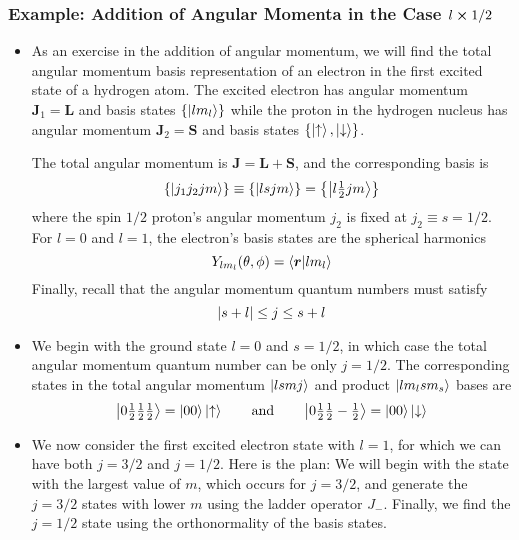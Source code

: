 \documentclass[11pt, a4paper]{article}
\renewcommand{\vec}[1]{\bm{#1}}  %
\newcommand{\ua}{\uparrow}  %
\newcommand{\da}{\downarrow}  %
\renewcommand{\r}{\vec{r}}  %
\renewcommand{\L}{\vec{L}}  %
\renewcommand{\S}{\vec{S}}  %
\newcommand{\J}{\vec{J}}  %
\begin{document}
\subsubsection{Example: Addition of Angular Momenta in the Case $ l \cross 1/2 $}
\begin{itemize}
    \item As an exercise in the addition of angular momentum, we will find the total angular momentum basis representation of an electron in the first excited state of a hydrogen atom. The excited electron has angular momentum $ \J_{1} = \L $ and basis states $ \{\ket{lm_{l}}\} $ while the proton in the hydrogen nucleus has angular momentum $ \J_{2} = \S $ and basis states $ \{\ket{\ua}, \ket{\da}\} $. 

    The total angular momentum is $ \J = \L + \S $, and the corresponding basis is
    \begin{equation*}
        \{ \ket{j_{1}j_{2}jm} \} \equiv \{\ket{lsjm}\} = \left\{ \ket{l \tfrac{1}{2}jm} \right\}
    \end{equation*}
    where the spin $ 1/2 $ proton's angular momentum $ j_{2} $ is fixed at $ j_{2} \equiv s = 1/2 $. For $ l = 0 $ and $ l= 1 $, the electron's basis states are the spherical harmonics
    \begin{equation*}
        Y_{lm_{l}}(\theta, \phi) = \braket{\r}{lm_{l}}
    \end{equation*}
    Finally, recall that the angular momentum quantum numbers must satisfy
    \begin{equation*}
        \abs{s + l} \leq j \leq s + l
    \end{equation*}
    

    \item We begin with the ground state $ l = 0 $ and $ s = 1/2 $, in which case the total angular momentum quantum number can be only $ j = 1/2 $. The corresponding states in the total angular momentum $ \ket{lsmj} $ and product $ \ket{lm_{l}sm_{s}} $ bases are
    \begin{equation*}
        \ket{0 \tfrac{1}{2} \tfrac{1}{2} \tfrac{1}{2}} = \ket{00}\ket{\ua} \qquad \text{and} \qquad \ket{0 \tfrac{1}{2} \tfrac{1}{2} -\tfrac{1}{2}}  = \ket{00}\ket{\da}
    \end{equation*}
    
    \item We now consider the first excited electron state with $ l = 1 $, for which we can have both $ j = 3/2 $ and $ j = 1/2 $. Here is the plan: We will begin with the state with the largest value of $ m $, which occurs for $ j = 3/2 $, and generate the $ j = 3/2 $ states with lower $ m $ using the ladder operator $ J_{-} $. Finally, we find the $ j = 1/2 $ state using the orthonormality of the basis states. 


\end{itemize}
\end{document}
